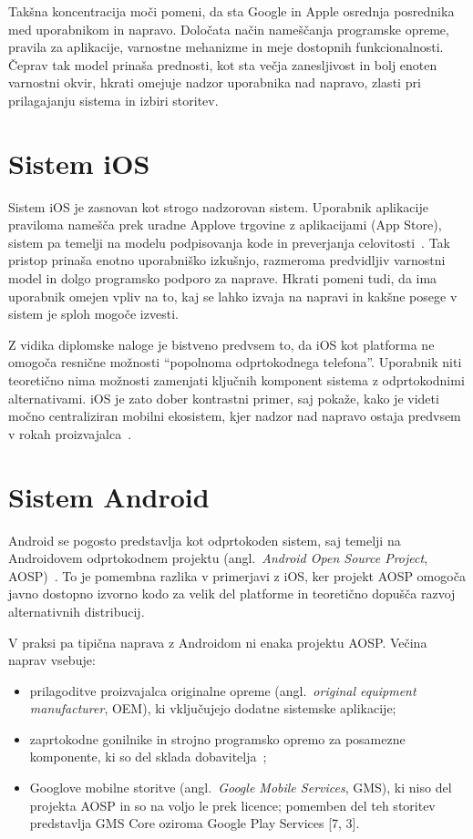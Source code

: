 \documentclass[a4paper,12pt,openright]{book}
\begin{document}
Takšna koncentracija moči pomeni, da sta Google in Apple osrednja posrednika med uporabnikom in napravo.
Določata način nameščanja programske opreme, pravila za aplikacije, varnostne mehanizme in meje dostopnih funkcionalnosti.
Čeprav tak model prinaša prednosti, kot sta večja zanesljivost in bolj enoten varnostni okvir, hkrati omejuje nadzor uporabnika nad napravo, zlasti pri prilagajanju sistema in izbiri storitev.

\section{Sistem iOS}
\label{sec:ios}

Sistem iOS je zasnovan kot strogo nadzorovan sistem.
Uporabnik aplikacije praviloma namešča prek uradne Applove trgovine z aplikacijami (App Store), sistem pa temelji na modelu podpisovanja kode in preverjanja celovitosti~\cite{apple_app_code_signing,apple_app_review_guidelines}.
Tak pristop prinaša enotno uporabniško izkušnjo, razmeroma predvidljiv varnostni model in dolgo programsko podporo za naprave.
Hkrati pomeni tudi, da ima uporabnik omejen vpliv na to, kaj se lahko izvaja na napravi in kakšne posege v sistem je sploh mogoče izvesti.

Z vidika diplomske naloge je bistveno predvsem to, da iOS kot platforma ne omogoča resnične možnosti \enquote{popolnoma odprtokodnega telefona}.
Uporabnik niti teoretično nima možnosti zamenjati ključnih komponent sistema z odprtokodnimi alternativami.
iOS je zato dober kontrastni primer, saj pokaže, kako je videti močno centraliziran mobilni ekosistem, kjer nadzor nad napravo ostaja predvsem v rokah proizvajalca~\cite{apple_app_review_guidelines}.

\section{Sistem Android}
\label{sec:android}

Android se pogosto predstavlja kot odprtokoden sistem, saj temelji na Androidovem odprtokodnem projektu (angl.~\textit{Android Open Source Project}, AOSP)~\cite{aosp_get_started_2025}.
To je pomembna razlika v primerjavi z iOS, ker projekt AOSP omogoča javno dostopno izvorno kodo za velik del platforme in teoretično dopušča razvoj alternativnih distribucij.

V praksi pa tipična naprava z Androidom ni enaka projektu AOSP.
Večina naprav vsebuje:
\begin{itemize}
  \item prilagoditve proizvajalca originalne opreme (angl.~\textit{original equipment manufacturer}, OEM), ki vključujejo dodatne sistemske aplikacije;
  \item zaprtokodne gonilnike in strojno programsko opremo za posamezne komponente, ki so del sklada dobavitelja~\cite{android_treble_vendor_system_split,android_hidl_versioning_treble};
  \item Googlove mobilne storitve (angl.~\textit{Google Mobile Services}, GMS), ki niso del projekta AOSP in so na voljo le prek licence; pomemben del teh storitev predstavlja GMS Core oziroma Google Play Services [7, 3].
\end{itemize}
\end{document}
